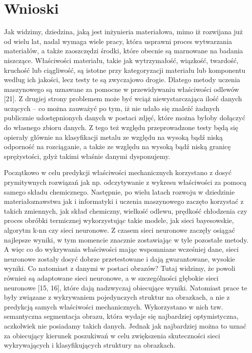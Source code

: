 \section{Wnioski}
\label{cha2.3}

Jak widzimy, dziedzina, jaką jest inżynieria materiałowa, mimo iż rozwijana już od wielu lat, nadal wymaga wiele pracy, która usprawni proces wytwarzania materiałów, a także zaoszczędzi środki, które obecnie są marnowane na badania niszczące. Właściwości materiału, takie jak wytrzymałość, wiązkość, twardość, kruchość lub ciągliwość, są istotne przy kategoryzacji materiału lub komponentu według ich jakości, lecz testy te są zwyczajowo drogie. Dlatego metody uczenia maszynowego są uznawane za pomocne w przewidywaniu właściwości odlewów [21]. Z drugiej strony problemem może być wciąż niewystarczająca ilość danych uczących –  co można zauważyć po tym, iż nie udało się znaleźć żadnych publicznie udostępnionych danych w postaci zdjęć, które można byłoby dołączyć do własnego zbioru danych. Z tego też względu przeprowadzone testy będą się opierały głównie na klasyfikacji metalu ze względu na wysoką bądź niską odporność na rozciąganie, a także ze względu na wysoką bądź niską granicę sprężystości, gdyż takimi właśnie danymi dysponujemy.

Początkowo w celu predykcji właściwości mechanicznych korzystano z dosyć prymitywnych rozwiązań jak np. odczytywanie z wykresu właściwości za pomocą samego składu chemicznego. Następnie, po wielu latach rozwoju w dziedzinie materiałoznawstwa jak i informatyki i uczenia maszynowego zaczęto korzystać z takich zmiennych, jak skład chemiczny, wielkość odlewu, prędkość chłodzenia czy proces obróbki termicznej wykorzystując takie modele, jak sieci bayesowskie, algorytm k-nn czy sieci neuronowe. Z czasem sieci neuronowe zaczęły osiągać najlepsze wyniki, w tym momencie znacznie zostawiając w tyle pozostałe metody. A więc co do wykrywania właściwości mając wspomniane wcześniej dane, sieci neuronowe zostały dosyć dobrze przetestowane i dają gwarantowane, wysokie wyniki. Co natomiast z danymi w postaci obrazów? Tutaj widzimy, że powoli również są adaptowane sieci neuronowe, a w szczególności głębokie sieci neuronowe [15, 16], które dają nadzwyczaj obiecujące wyniki. Natomiast prace te były związane z wykrywaniem pojedynczych struktur na obrazkach, a nie z predykcją samych właściwości mechanicznych. Wykorzystano w nich tzw. semantyczna segmentacja obrazu, która wydaje się najbardziej optymistyczna, aczkolwiek nie posiadamy takich danych. Jednak jak najbardziej można to uznać za obiecujący kierunek poszukiwań w celu zwiększenia skuteczności sieci wykrywających i klasyfikujących struktury na obrazkach.

